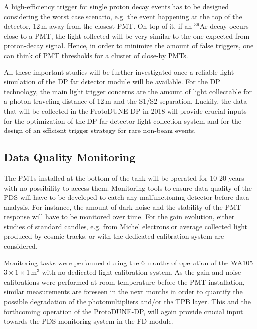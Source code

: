 A high-efficiency trigger for single proton decay events has to be designed considering the worst case scenario, e.g. the event happening at the top of the detector, 12\,m away from the closest PMT. On top of it, if an $^{39}$Ar decay occurs close to a PMT, the light collected will be very similar to the one expected from proton-decay signal. Hence, in order to minimize the amount of false triggers, one can think of PMT thresholds for a cluster of close-by PMTs.

All these important studies will be further investigated once a reliable light simulation of the DP far detector module will be available. For the DP technology, the main light trigger concerns are the amount of light collectable for a photon traveling distance of 12\,m and the S1/S2 separation. Luckily, the data that will be collected in the ProtoDUNE-DP in 2018 will provide crucial inputs for the optimization of the DP far detector light collection system and for the design of an efficient trigger strategy for rare non-beam events. 

\subsection{Data Quality Monitoring}
\label{sec:fddp-pd-7.3}

The PMTs installed at the bottom of the tank will be operated for 10-20 years with no possibility to access them. Monitoring tools to ensure data quality of the PDS will have to be developed to catch any malfunctioning detector before data analysis. For instance, the amount of dark noise and the stability of the PMT response will have to be monitored over time. For the gain evolution, either studies of standard candles, e.g. from Michel electrons or average collected light produced by cosmic tracks, or with the dedicated calibration system are considered.

Monitoring tasks were performed during the 6 months of operation of the WA105 $3\times1\times1$\,m$^3$ with no dedicated light calibration system. As the gain and noise calibrations were performed at room temperature before the PMT installation, similar measurements are foreseen in the next months in order to quantify the possible degradation of the photomultipliers and/or the TPB layer. This and the forthcoming operation of the ProtoDUNE-DP, will again provide crucial input towards the PDS monitoring system in the FD module.

